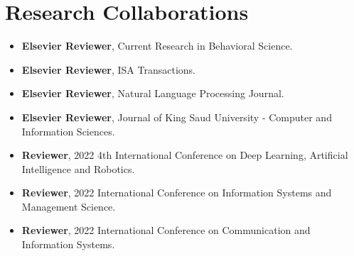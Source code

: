 \section{\textbf{Research Collaborations}}
\begin{itemize}[leftmargin=*,itemsep=2pt,parsep=0pt]
    \item \textbf{Elsevier Reviewer}, Current Research in Behavioral Science.
    \item \textbf{Elsevier Reviewer}, ISA Transactions.
    \item \textbf{Elsevier Reviewer}, Natural Language Processing Journal.
    \item \textbf{Elsevier Reviewer}, Journal of King Saud University - Computer
    and Information Sciences.
    \item \textbf{Reviewer}, 2022 4th International Conference on Deep Learning,
    Artificial Intelligence and Robotics.
    \item \textbf{Reviewer}, 2022 International Conference on Information Systems
    and Management Science.
    \item \textbf{Reviewer}, 2022 International Conference on Communication and Information
    Systems.
\end{itemize}

